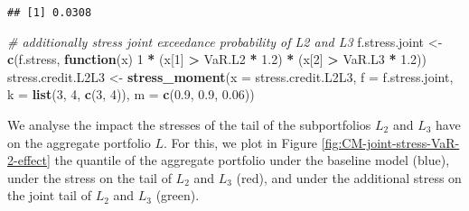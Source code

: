 \documentclass[
]{article}
\newenvironment{Shaded}{\begin{snugshade}}{\end{snugshade}}
\newcommand{\CommentTok}[1]{\textcolor[rgb]{0.56,0.35,0.01}{\textit{#1}}}
\newcommand{\ControlFlowTok}[1]{\textcolor[rgb]{0.13,0.29,0.53}{\textbf{#1}}}
\newcommand{\DataTypeTok}[1]{\textcolor[rgb]{0.13,0.29,0.53}{#1}}
\newcommand{\DecValTok}[1]{\textcolor[rgb]{0.00,0.00,0.81}{#1}}
\newcommand{\FloatTok}[1]{\textcolor[rgb]{0.00,0.00,0.81}{#1}}
\newcommand{\KeywordTok}[1]{\textcolor[rgb]{0.13,0.29,0.53}{\textbf{#1}}}
\newcommand{\NormalTok}[1]{#1}
\newcommand{\OperatorTok}[1]{\textcolor[rgb]{0.81,0.36,0.00}{\textbf{#1}}}
\newcommand{\StringTok}[1]{\textcolor[rgb]{0.31,0.60,0.02}{#1}}
\begin{document}
\begin{verbatim}
## [1] 0.0308
\end{verbatim}

\begin{Shaded}
\begin{Highlighting}[]
\CommentTok{\# additionally stress joint exceedance probability of L2 and L3}
\NormalTok{f.stress.joint \textless{}{-}}\StringTok{ }\KeywordTok{c}\NormalTok{(f.stress, }\ControlFlowTok{function}\NormalTok{(x) }\DecValTok{1} \OperatorTok{*}\StringTok{ }\NormalTok{(x[}\DecValTok{1}\NormalTok{] }\OperatorTok{\textgreater{}}\StringTok{ }\NormalTok{VaR.L2 }\OperatorTok{*}\StringTok{ }\FloatTok{1.2}\NormalTok{) }\OperatorTok{*}\StringTok{ }\NormalTok{(x[}\DecValTok{2}\NormalTok{] }\OperatorTok{\textgreater{}}\StringTok{ }
\StringTok{    }\NormalTok{VaR.L3 }\OperatorTok{*}\StringTok{ }\FloatTok{1.2}\NormalTok{))}
\NormalTok{stress.credit.L2L3 \textless{}{-}}\StringTok{ }\KeywordTok{stress\_moment}\NormalTok{(}\DataTypeTok{x =}\NormalTok{ stress.credit.L2L3, }\DataTypeTok{f =}\NormalTok{ f.stress.joint, }
    \DataTypeTok{k =} \KeywordTok{list}\NormalTok{(}\DecValTok{3}\NormalTok{, }\DecValTok{4}\NormalTok{, }\KeywordTok{c}\NormalTok{(}\DecValTok{3}\NormalTok{, }\DecValTok{4}\NormalTok{)), }\DataTypeTok{m =} \KeywordTok{c}\NormalTok{(}\FloatTok{0.9}\NormalTok{, }\FloatTok{0.9}\NormalTok{, }\FloatTok{0.06}\NormalTok{))}
\end{Highlighting}
\end{Shaded}

We analyse the impact the stresses of the tail of the subportfolios \(L_2\) and \(L_3\) have on the aggregate portfolio \(L\). For this, we plot in Figure \ref{fig:CM-joint-stress-VaR-2-effect} the quantile of the aggregate portfolio under the baseline model (blue), under the stress on the tail of \(L_2\) and \(L_3\) (red), and under the additional stress on the joint tail of \(L_2\) and \(L_3\) (green).
\end{document}
